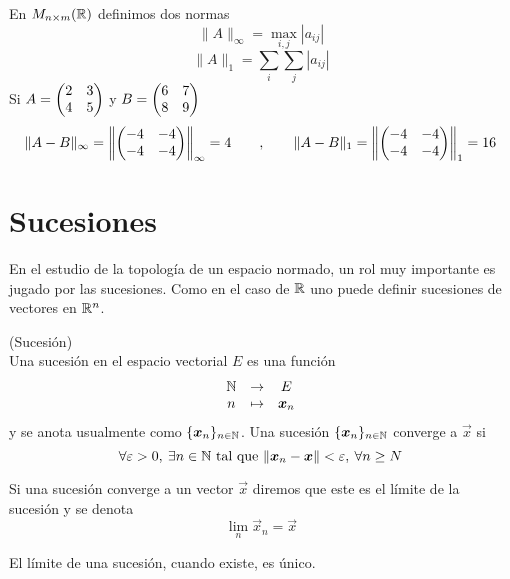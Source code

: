 \begin{ejemplo}
En $M_{n\times m}(\mathbb{R})$ definimos dos normas
$$\|A\|_\infty=\max_{i,j}{|a_{ij}|}$$
$$\|A\|_1=\sum_i\sum_j|a_{ij}|$$ 
Si $A=\begin{pmatrix}2&3\cr4&5\cr\end{pmatrix}$ y $B=\begin{pmatrix}6&7\cr 8&9\cr\end{pmatrix}$ 
$$\|A-B\|_\infty = \left\|\begin{pmatrix}-4&-4\cr -4&-4\cr\end{pmatrix}\right\|_\infty = 4 \qquad , \qquad \|A-B\|_1 = \left\|\begin{pmatrix}-4&-4\cr -4&-4\cr\end{pmatrix}\right\|_1 = 16$$
\end{ejemplo}

\section{Sucesiones}

En el estudio de la topolog\'ia de un espacio normado, un rol muy importante es jugado por las sucesiones. Como en el caso de $\mathbb{R}$ uno puede definir sucesiones de vectores en $\mathbb{R}^n$. %

\begin{definicion}{\rm (Sucesi\'on)}
\\Una sucesi\'on en el espacio vectorial $E$ es una funci\'on
\[\begin{matrix}\mathbb{N} & \to &E \cr n &\mapsto &\boldsymbol{x}_n \cr\end{matrix}\] 
y se anota usualmente como $\{\boldsymbol{x}_n\}_{n\in \mathbb{N}}$. Una sucesi\'on $\{\boldsymbol{x}_n\}_{n\in \mathbb{N}}$ converge a $\vec{x}$ si
$$\forall \varepsilon >0,\: \exists n\in\mathbb{N} \text{ tal que } \|\boldsymbol{x}_n-\boldsymbol{x}\|<\varepsilon,\:\forall n\geq N$$

Si una sucesi\'on converge a un vector $\vec{x}$ diremos que este es el l\'imite de la sucesi\'on y se denota
$$\lim_{n} \vec{x}_n = \vec{x}$$
\end{definicion}

\begin{proposicion}
El l\'imite de una sucesi\'on, cuando existe, es \'unico.
\end{proposicion}

